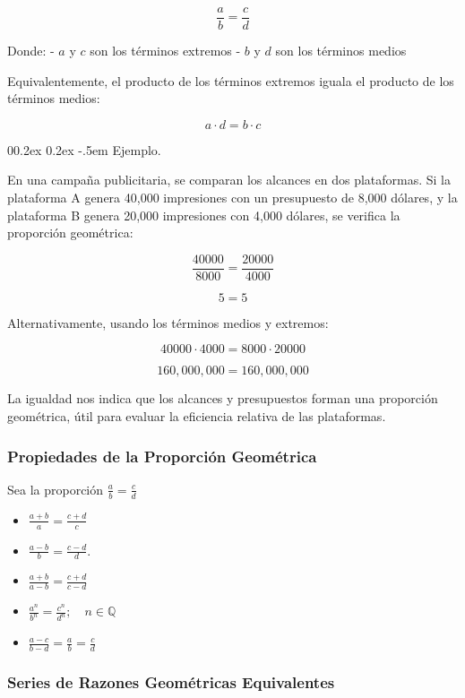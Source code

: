 \documentclass[
  stu,
  floatsintext,
  longtable,
  a4paper,
  nolmodern,
  notxfonts,
  notimes,
  colorlinks=true,linkcolor=blue,citecolor=blue,urlcolor=blue]{apa7}
\makeatletter
\renewcommand{\paragraph}{\@startsection{paragraph}{4}{\parindent}%
	{0\baselineskip \@plus 0.2ex \@minus 0.2ex}%
	{-.5em}%
	{\normalfont\normalsize\bfseries\typesectitle}}
\makeatother
\begin{document}
\[
\frac{a}{b} = \frac{c}{d}
\]

Donde: - \(a\) y \(c\) son los términos extremos - \(b\) y \(d\) son los
términos medios

Equivalentemente, el producto de los términos extremos iguala el
producto de los términos medios:

\[
a \cdot d = b \cdot c
\]

\paragraph{Ejemplo.}\label{ejemplo-1}

En una campaña publicitaria, se comparan los alcances en dos
plataformas. Si la plataforma A genera 40,000 impresiones con un
presupuesto de 8,000 dólares, y la plataforma B genera 20,000
impresiones con 4,000 dólares, se verifica la proporción geométrica:

\[
\frac{40000}{8000} = \frac{20000}{4000}
\]

\[
5 = 5
\]

Alternativamente, usando los términos medios y extremos:

\[
40000 \cdot 4000 = 8000 \cdot 20000
\]

\[
160,000,000 = 160,000,000
\]

La igualdad nos indica que los alcances y presupuestos forman una
proporción geométrica, útil para evaluar la eficiencia relativa de las
plataformas.

\subsubsection{Propiedades de la Proporción
Geométrica}\label{propiedades-de-la-proporciuxf3n-geomuxe9trica}

Sea la proporción \(\frac{a}{b} = \frac{c}{d}\)

\begin{itemize}
\item
  \(\frac{a+b}{a} = \frac{c+d}{c}\)
\item
  \(\frac{a-b}{b} = \frac{c-d}{d}.\)
\item
  \(\frac{a+b}{a-b} = \frac{c+d}{c-d}\)
\item
  \(\frac{a^n}{b^n} = \frac{c^n}{d^n} ; \quad n \in \mathbb{Q}\)
\item
  \(\frac{a-c}{b-d} = \frac{a}{b} = \frac{c}{d}\)
\end{itemize}

\subsubsection{Series de Razones Geométricas
Equivalentes}\label{series-de-razones-geomuxe9tricas-equivalentes}
\end{document}
